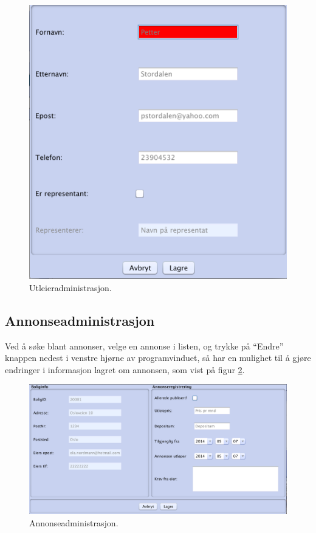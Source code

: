 \begin{figure}[h!]
\center
 \includegraphics[scale=0.5]{./img/brukerveiledning/11.png}
 \caption{Utleieradministrasjon.}
 \label{fig:bv:11}
\end{figure}




\newpage
\subsection{Annonseadministrasjon}
Ved å søke blant annonser, velge en annonse i listen, og trykke på “Endre” knappen nedest i venstre hjørne av programvinduet, så har en mulighet til å gjøre endringer i informasjon lagret om annonsen, som vist på figur \ref{fig:bv:12}.

\begin{figure}[h!]
 \includegraphics[width=\textwidth,height=\textheight,keepaspectratio]{./img/brukerveiledning/12.png}
 \caption{Annonseadministrasjon.}
 \label{fig:bv:12}
\end{figure}



